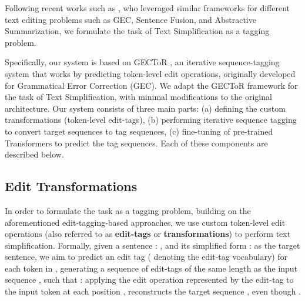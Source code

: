 \documentclass[11pt,a4paper]{article}
\begin{document}
Following recent works such as \citet{malmi-etal-2019-encode, awasthi-etal-2019-parallel, omelianchuk-etal-2020-gector}, who leveraged similar frameworks for different text editing problems such as GEC, Sentence Fusion, and Abstractive Summarization, we formulate the task of Text Simplification as a tagging problem.

Specifically, our system is based on GECToR \cite{omelianchuk-etal-2020-gector}, an iterative sequence-tagging system that works by predicting token-level edit operations, originally developed for Grammatical Error Correction (GEC). 
We adapt the GECToR framework for the task of Text Simplification, with minimal modifications to the original architecture. Our system consists of three main parts: (a) defining the custom transformations (token-level edit-tags), (b) performing iterative sequence tagging to convert target sequences to tag sequences, (c) fine-tuning of pre-trained Transformers to predict the tag sequences. Each of these components are described below.

\subsection{Edit Transformations}
\label{section:transformations}
In order to formulate the task as a tagging problem, building on the aforementioned edit-tagging-based approaches, we use custom token-level edit operations (also referred to as \textbf{edit-tags} or \textbf{transformations}) to perform text simplification. Formally, given a sentence : , and its simplified form :  as the target sentence, we aim to predict an edit tag  ( denoting the edit-tag vocabulary) for each token  in , generating a sequence of edit-tags of the same length  as the input sequence , such that : applying the edit operation represented by the edit-tag  to the input token  at each position , reconstructs the target sequence , even though .
\end{document}
